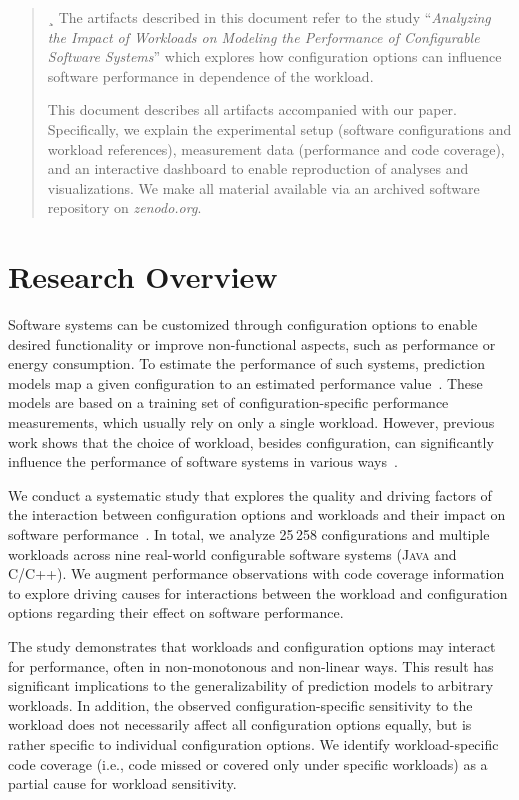 \begin{abstract}¸
	The artifacts described in this document refer to the study ``\textit{Analyzing the Impact of Workloads on Modeling the Performance of Configurable Software Systems}'' which explores how configuration options can influence software performance in dependence of the workload.
	
	This document describes all artifacts accompanied with our paper.	
	Specifically, we explain the experimental setup (software configurations and workload references), measurement data (performance and code coverage), and an interactive dashboard to enable reproduction of analyses and visualizations. We make all material available via an archived software repository on \textit{zenodo.org}.
\end{abstract}

\section{Research Overview}
Software systems can be customized through configuration options to enable desired functionality or improve non-functional aspects, such as performance or energy consumption. To estimate the performance of such systems, prediction models map a given configuration to an estimated performance value~\cite{pereira_2021_learning,kaltenecker_interplay_2020}. These models are based on a training set of configuration-specific performance measurements, which usually rely on only a single workload. However, previous work shows that the choice of workload, besides configuration, can significantly influence the performance of software systems in various ways~\cite{alves_sampling_2020,lesoil_2021}.  

We conduct a systematic study that explores the quality and driving factors of the interaction between configuration options and workloads and their impact on software performance~\cite{muhlbauer_workload_2023}. In total, we analyze 25\,258 configurations and multiple workloads across nine real-world configurable software systems (\textsc{Java} and \textsc{C}/\textsc{C++}). We augment performance observations with code coverage information to explore driving causes for interactions between the workload and configuration options regarding their effect on software performance. 

The study demonstrates that workloads and configuration options may interact for performance, often in non-monotonous and non-linear ways. This result has significant implications to the generalizability of prediction models to arbitrary workloads. In addition, the observed configuration-specific sensitivity to the workload does not necessarily affect all configuration options equally, but is rather specific to individual configuration options. We identify workload-specific code coverage (i.e., code missed or covered only under specific workloads) as a partial cause for workload sensitivity.

